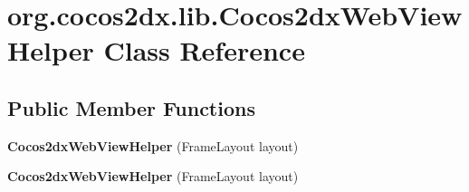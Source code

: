 \hypertarget{classorg_1_1cocos2dx_1_1lib_1_1Cocos2dxWebViewHelper}{}\section{org.\+cocos2dx.\+lib.\+Cocos2dx\+Web\+View\+Helper Class Reference}
\label{classorg_1_1cocos2dx_1_1lib_1_1Cocos2dxWebViewHelper}
\subsection*{Public Member Functions}
\begin{DoxyCompactItemize}
\item 
\mbox{\label{classorg_1_1cocos2dx_1_1lib_1_1Cocos2dxWebViewHelper_ab865a58c28a113141204c55826c564f6}} 
{\bfseries Cocos2dx\+Web\+View\+Helper} (Frame\+Layout layout)
\item 
\mbox{\label{classorg_1_1cocos2dx_1_1lib_1_1Cocos2dxWebViewHelper_ab865a58c28a113141204c55826c564f6}} 
{\bfseries Cocos2dx\+Web\+View\+Helper} (Frame\+Layout layout)
\end{DoxyCompactItemize}

